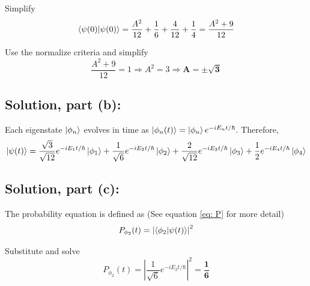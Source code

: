 \documentclass[12pt]{article}
\begin{document}
        Simplify
        \[
            \braket{\psi(0)}{\psi(0)} = \frac{A^2}{12} + \frac{1}{6} + \frac{4}{12} + \frac{1}{4} = \frac{A^2 + 9}{12}
        \]

        Use the normalize criteria and simplify
        \[
            \frac{A^2 + 9}{12} = 1 \Rightarrow A^2 = 3 \Rightarrow \boldsymbol{\boxed{A = \pm \sqrt{3}}}
        \]

    \subsection{Solution, part (b):}
        Each eigenstate \( \ket{\phi_n} \) evolves in time as \( \ket{\phi_n(t)} = \ket{\phi_n} e^{-iE_n t/\hbar} \). Therefore,
        \[
            \ket{\psi(t)} = \frac{\sqrt{3}}{\sqrt{12}} e^{-iE_1 t/\hbar} \ket{\phi_1}
            + \frac{1}{\sqrt{6}} e^{-iE_2 t/\hbar} \ket{\phi_2}
            + \frac{2}{\sqrt{12}} e^{-iE_3 t/\hbar} \ket{\phi_3}
            + \frac{1}{2} e^{-iE_4 t/\hbar} \ket{\phi_4}
        \]

    \subsection{Solution, part (c):}
        The probability equation is defined as (See equation \ref{eq: P} for more detail)
    \[
        P_{\phi_2}(t) = \left| \braket{\phi_2}{\psi(t)} \right|^2
    \]

    Substitute and solve
    \[
         P_{\phi_2}(t) = \left| \frac{1}{\sqrt{6}} e^{-iE_2 t/\hbar} \right|^2 = \boldsymbol{\boxed{\frac{1}{6}}}
    \]
\end{document}
